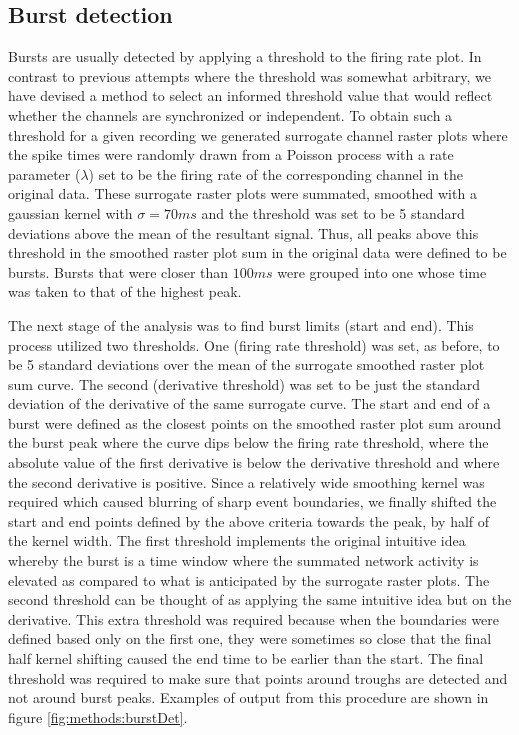 \subsection{Burst detection}
Bursts are usually detected by applying a threshold to the firing rate plot. In contrast to previous attempts \cite{wagenaar2006extremely,chiappalone2005burst} where the threshold was somewhat arbitrary, we have devised a method to select an informed threshold value that would reflect whether the channels are synchronized or independent. To obtain such a threshold for a given recording we generated surrogate channel raster plots where the spike times were randomly drawn from a Poisson process with a rate parameter (\(\lambda\)) set to be the firing rate of the corresponding channel in the original data. These surrogate raster plots were summated, smoothed with a gaussian kernel with \(\sigma=70ms\) and the threshold was set to be 5 standard deviations above the mean of the resultant signal. Thus, all peaks above this threshold in the smoothed raster plot sum in the original data were defined to be bursts. Bursts that were closer than \(100ms\) were grouped into one whose time was taken to that of the highest peak.

The next stage of the analysis was to find burst limits (start and end). This process utilized two thresholds. One (firing rate threshold) was set, as before, to be 5 standard deviations over the mean of the surrogate smoothed raster plot sum curve. The second (derivative threshold) was set to be just the standard deviation of the derivative of the same surrogate curve. The start and end of a burst were defined as the closest points on the smoothed raster plot sum around the burst peak where the curve dips below the firing rate threshold, where the absolute value of the first derivative is below the derivative threshold and where the second derivative is positive. Since a relatively wide smoothing kernel was required which caused blurring of sharp event boundaries, we finally shifted the start and end points defined by the above criteria towards the peak, by half of the kernel width. The first threshold implements the original intuitive idea whereby the burst is a time window where the summated network activity is elevated as compared to what is anticipated by the surrogate raster plots. The second threshold can be thought of as applying the same intuitive idea but on the derivative. This extra threshold was required because when the boundaries were defined based only on the first one, they were sometimes so close that the final half kernel shifting caused the end time to be earlier than the start. The final threshold was required to make sure that points around troughs are detected and not around burst peaks. Examples of output from this procedure are shown in figure \ref{fig:methods:burstDet}.


